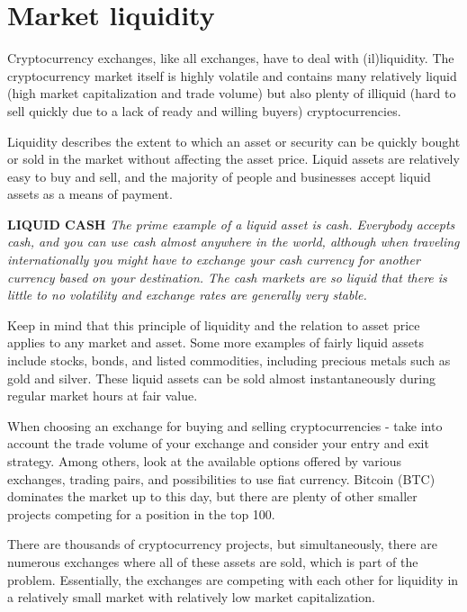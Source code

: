 \newpage

\section{Market liquidity}
Cryptocurrency exchanges, like all exchanges, have to deal with (il)liquidity. The cryptocurrency market itself is highly volatile and contains many relatively liquid (high market capitalization and trade volume) but also plenty of illiquid (hard to sell quickly due to a lack of ready and willing buyers) cryptocurrencies. 

Liquidity describes the extent to which an asset or security can be quickly bought or sold in the market without affecting the asset price. Liquid assets are relatively easy to buy and sell, and the majority of people and businesses accept liquid assets as a means of payment.

    \bigskip  
    \begin{cryptobox}{\textbf{LIQUID CASH}}
        \textit{The prime example of a liquid asset is cash. Everybody accepts cash, and you can use cash almost anywhere in the world, although when traveling internationally you might have to exchange your cash currency for another currency based on your destination. The cash markets are so liquid that there is little to no volatility and exchange rates are generally very stable.}
    \end{cryptobox}
    \medskip

Keep in mind that this principle of liquidity and the relation to asset price applies to any market and asset. Some more examples of fairly liquid assets include stocks, bonds, and listed commodities, including precious metals such as gold and silver. These liquid assets can be sold almost instantaneously during regular market hours at fair value.

When choosing an exchange for buying and selling cryptocurrencies - take into account the trade volume of your exchange and consider your entry and exit strategy. Among others, look at the available options offered by various exchanges, trading pairs, and possibilities to use fiat currency. Bitcoin (BTC) dominates the market up to this day, but there are plenty of other smaller projects competing for a position in the top 100. 

There are thousands of cryptocurrency projects, but simultaneously, there are numerous exchanges where all of these assets are sold, which is part of the problem. Essentially, the exchanges are competing with each other for liquidity in a relatively small market with relatively low market capitalization. 

